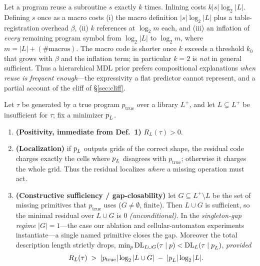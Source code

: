 \begin{proposition}\label{prop:reuse}
Let a program reuse a subroutine $s$ exactly $k$ times. Inlining costs $k|s|\log_2|L|$. Defining $s$ once as a
macro costs (i) the macro definition $|s|\log_2|L|$ plus a table-registration overhead $\beta$, (ii) $k$
references at $\log_2 m$ each, and (iii) an inflation of \emph{every} remaining program symbol from $\log_2|L|$
to $\log_2 m$, where $m=|L|+(\text{\#macros})$. The macro code is shorter once $k$ exceeds a threshold
$k_0$ that grows with $\beta$ and the inflation term; in particular $k=2$ is \emph{not} in general sufficient.
Thus a hierarchical MDL prior prefers compositional explanations \emph{when reuse is frequent enough}---the
expressivity a flat predictor cannot represent, and a partial account of the cliff of \S\ref{sec:cliff}.
\end{proposition}

\begin{theorem}\label{thm:residual}
Let $\tau$ be generated by a true program $p_{\mathrm{true}}$ over a library $L^{+}$, and let
$L\subsetneq L^{+}$ be insufficient for $\tau$; fix a minimizer $p^{\*}_L$.
\begin{enumerate}[label=(\alph*),leftmargin=1.8em,itemsep=1pt]
  \item \textbf{(Positivity, immediate from Def.~1)} $R_L(\tau)>0$.
  \item \textbf{(Localization)} if $p^{\*}_L$ outputs grids of the correct shape, the residual code charges
  exactly the cells where $p^{\*}_L$ disagrees with $p_{\mathrm{true}}$; otherwise it charges the whole grid.
  Thus the residual localizes \emph{where} a missing operation must act.
  \item \textbf{(Constructive sufficiency / gap-closability)} let $G\subseteq L^{+}\setminus L$ be the set of
  missing primitives that $p_{\mathrm{true}}$ uses ($G\neq\emptyset$, finite). Then $L\cup G$ is sufficient,
  so the minimal residual over $L\cup G$ is $0$ \emph{(unconditional)}. In the \emph{singleton-gap regime}
  $|G|=1$---the case our ablation and cellular-automaton experiments instantiate---a single named primitive
  closes the gap. Moreover the total description length strictly drops,
  $\min_p \mathrm{DL}_{L\cup G}(\tau\mid p)<\mathrm{DL}_L(\tau\mid p^{\*}_L)$, \emph{provided}
  \begin{equation}
  R_L(\tau)\;>\;|p_{\mathrm{true}}|\log_2|L\cup G|\;-\;|p^{\*}_L|\log_2|L|.
  \label{eq:cond}
  \end{equation}
\end{enumerate}
\end{theorem}

